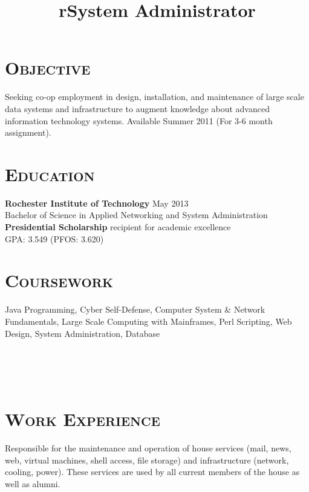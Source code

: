 \begin{resume}


\section{\textsc{Objective}}
Seeking co-op employment in design, installation, and maintenance of large scale data systems and infrastructure to augment knowledge about advanced information technology systems. Available Summer 2011 (For 3-6 month assignment).
\section{\textsc{Education}}

\textbf{Rochester Institute of Technology} \hfill May 2013 \\
Bachelor of Science in Applied Networking and System Administration \\
{\bf Presidential Scholarship} recipient for academic excellence \\
GPA: 3.549 (PFOS: 3.620)

\section{\textsc{Coursework}}

Java Programming, Cyber Self-Defense, Computer System \& Network Fundamentals, Large Scale Computing with Mainframes, Perl Scripting, Web Design, System Administration, Database

\begin{formatb}
  \title{r}\\
  \\
  \body\\
\end{formatb}

\section{\textsc{Work Experience}}

\title{System Administrator}
\begin{position}
Responsible for the maintenance and operation of house services (mail, news, web, virtual machines, shell access, file storage) and infrastructure (network, cooling, power). These services are used by all current members of the house as well as alumni.
\end{position}


\end{resume}
